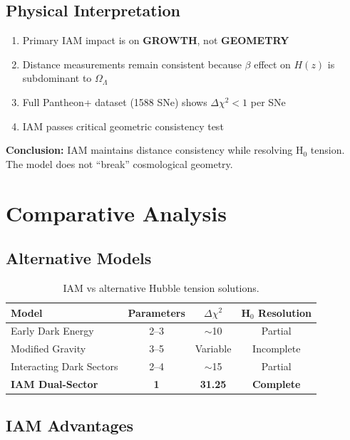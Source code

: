\documentclass[11pt,letterpaper]{article}
\begin{document}
\subsection{Physical Interpretation}

\begin{enumerate}
\item Primary IAM impact is on \textbf{GROWTH}, not \textbf{GEOMETRY}
\item Distance measurements remain consistent because $\beta$ effect on $H(z)$ is subdominant to $\Omega_\Lambda$
\item Full Pantheon+ dataset (1588 SNe) shows $\Delta\chi^2 < 1$ per SNe
\item IAM passes critical geometric consistency test
\end{enumerate}

\noindent\textbf{Conclusion:} IAM maintains distance consistency while resolving H$_0$ tension. The model does not ``break'' cosmological geometry.

\section{Comparative Analysis}

\subsection{Alternative Models}

\begin{table}[h]
\centering
\begin{tabular}{lccc}
\toprule
Model & Parameters & $\Delta\chi^2$ & H$_0$ Resolution \\
\midrule
Early Dark Energy & 2--3 & $\sim$10 & Partial \\
Modified Gravity & 3--5 & Variable & Incomplete \\
Interacting Dark Sectors & 2--4 & $\sim$15 & Partial \\
\midrule
\textbf{IAM Dual-Sector} & \textbf{1} & \textbf{31.25} & \textbf{Complete} \\
\bottomrule
\end{tabular}
\caption{IAM vs alternative Hubble tension solutions.}
\end{table}

\subsection{IAM Advantages}
\end{document}
